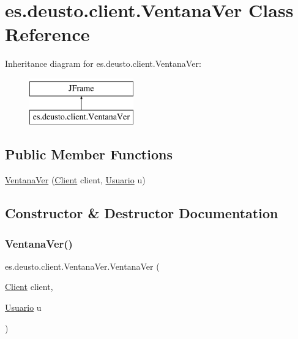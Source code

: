 \hypertarget{classes_1_1deusto_1_1client_1_1_ventana_ver}{}\section{es.\+deusto.\+client.\+Ventana\+Ver Class Reference}
\label{classes_1_1deusto_1_1client_1_1_ventana_ver}
Inheritance diagram for es.\+deusto.\+client.\+Ventana\+Ver\+:\begin{figure}[H]
\begin{center}
\leavevmode
\includegraphics[height=2.000000cm]{classes_1_1deusto_1_1client_1_1_ventana_ver}
\end{center}
\end{figure}
\subsection*{Public Member Functions}
\begin{DoxyCompactItemize}
\item 
\mbox{\hyperlink{classes_1_1deusto_1_1client_1_1_ventana_ver_ac53c302eabef4830a1c0fa0831e3cff8}{Ventana\+Ver}} (\mbox{\hyperlink{classes_1_1deusto_1_1client_1_1_client}{Client}} client, \mbox{\hyperlink{classes_1_1deusto_1_1server_1_1jdo_1_1_usuario}{Usuario}} u)
\end{DoxyCompactItemize}


\subsection{Constructor \& Destructor Documentation}
\mbox{\label{classes_1_1deusto_1_1client_1_1_ventana_ver_ac53c302eabef4830a1c0fa0831e3cff8}} 
\subsubsection{\texorpdfstring{VentanaVer()}{VentanaVer()}}
{\footnotesize\ttfamily es.\+deusto.\+client.\+Ventana\+Ver.\+Ventana\+Ver (\begin{DoxyParamCaption}\item[{\mbox{\hyperlink{classes_1_1deusto_1_1client_1_1_client}{Client}}}]{client,  }\item[{\mbox{\hyperlink{classes_1_1deusto_1_1server_1_1jdo_1_1_usuario}{Usuario}}}]{u }\end{DoxyParamCaption})}



